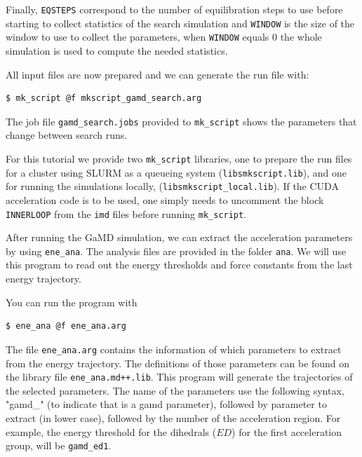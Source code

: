 Finally, \texttt{EQSTEPS}  correspond to the number of equilibration steps to use before starting to collect statistics of the search simulation and \texttt{WINDOW} is the size of the window to use to collect the parameters, when \texttt{WINDOW} equals 0 the whole simulation is used to compute the needed statistics.

All input files are now prepared and we can generate the run file with:
\begin{lstlisting}
$ mk_script @f mkscript_gamd_search.arg
\end{lstlisting}
The job file \texttt{gamd\_search.jobs} provided to \texttt{mk\_script} shows the parameters that change between search runs.

For this tutorial we provide two \texttt{mk\_script} libraries, one to prepare the run files for a cluster using SLURM as a queueing system (\texttt{libs\/mkscript.lib}), and one for running the simulations locally, (\texttt{libs\/mkscript\_local.lib}). If the CUDA acceleration code is to be used, one simply needs to uncomment the block \texttt{INNERLOOP} from the \texttt{imd} files before running \texttt{mk\_script}.

After running the GaMD simulation, we can extract the acceleration parameters by using \texttt{ene\_ana}. The analysis files are provided in the folder \texttt{ana}.
We will use this program to read out the energy thresholds and force constants from the last energy trajectory.

You can run the program with 
\begin{lstlisting}
$ ene_ana @f ene_ana.arg
\end{lstlisting}

The file \texttt{ene\_ana.arg} contains the information of which parameters to extract from the energy trajectory. The definitions of those parameters can be found on the library file \texttt{ene\_ana.md++.lib}. This program will generate the trajectories of the selected parameters. The name of the parameters use the following syntax, "gamd\_" (to indicate that is a gamd parameter), followed by parameter to extract (in lower case), followed by the number of the acceleration region. For example, the energy threshold for the dihedrals ($ED$) for the first acceleration group, will be \texttt{gamd\_ed1}.

